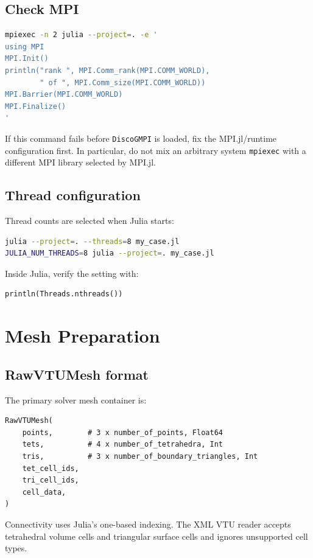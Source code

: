 \documentclass[11pt,oneside]{book}
\newcommand{\pkg}{\texttt{DiscoGMPI}}
\newcommand{\code}[1]{\texttt{#1}}
\begin{document}
\section{Check MPI}

\begin{lstlisting}[language=bash]
mpiexec -n 2 julia --project=. -e '
using MPI
MPI.Init()
println("rank ", MPI.Comm_rank(MPI.COMM_WORLD),
        " of ", MPI.Comm_size(MPI.COMM_WORLD))
MPI.Barrier(MPI.COMM_WORLD)
MPI.Finalize()
'
\end{lstlisting}

If this command fails before \pkg{} is loaded, fix the MPI.jl/runtime
configuration first. In particular, do not mix an arbitrary system
\code{mpiexec} with a different MPI library selected by MPI.jl.

\section{Thread configuration}

Thread counts are selected when Julia starts:

\begin{lstlisting}[language=bash]
julia --project=. --threads=8 my_case.jl
JULIA_NUM_THREADS=8 julia --project=. my_case.jl
\end{lstlisting}

Inside Julia, verify the setting with:

\begin{lstlisting}
println(Threads.nthreads())
\end{lstlisting}

\chapter{Mesh Preparation}

\section{RawVTUMesh format}

The primary solver mesh container is:

\begin{lstlisting}
RawVTUMesh(
    points,        # 3 x number_of_points, Float64
    tets,          # 4 x number_of_tetrahedra, Int
    tris,          # 3 x number_of_boundary_triangles, Int
    tet_cell_ids,
    tri_cell_ids,
    cell_data,
)
\end{lstlisting}

Connectivity uses Julia's one-based indexing. The XML VTU reader accepts
tetrahedral volume cells and triangular surface cells and ignores unsupported
cell types.
\end{document}
